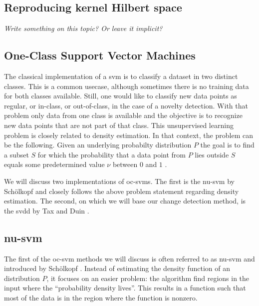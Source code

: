 
\subsection{Reproducing kernel Hilbert space}
\emph{Write something on this topic? Or leave it implicit?}



\subsection{One-Class Support Vector Machines}\label{subsec:one-class-svm}
The classical implementation of a \gls{svm} is to classify a dataset in two distinct classes.
This is a common usecase, although sometimes there is no training data for both classes available.
Still, one would like to classify new data points as regular, or in-class, or out-of-class, \eg in the case of a novelty detection.
With that problem only data from one class is available and the objective is to recognize new data points that are not part of that class.
This unsupervised learning problem is closely related to density estimation.
In that context, the problem can be the following.
Given an underlying probabilty distribution $P$ the goal is to find a subset $S$ for which the probability that a data point from $P$ lies outside $S$ equals some predetermined value $\nu$ between $0$ and $1$ \cite{scholkopf1999support}.

We will discuss two implementations of \glspl{oc-svm}.
The first is the \gls{nu-svm} by Sch\"olkopf \etal \cite{scholkopf1999support} and closely follows the above problem statement regarding density estimation.
The second, on which we will base our change detection method, is the \gls{svdd} by Tax and Duin \cite{tax1999support}.



\subsection{\acrlong{nu-svm}}\label{subsec:nu-svm}
The first of the \gls{oc-svm} methods we will discuss is often referred to as \gls{nu-svm} and introduced by Sch\"olkopf \etal \cite{scholkopf1999support}.
Instead of estimating the density function of an distribution $P$, it focuses on an easier problem: the algorithm find regions in the input where the ``probability density lives''.
This results in a function such that most of the data is in the region where the function is nonzero.

